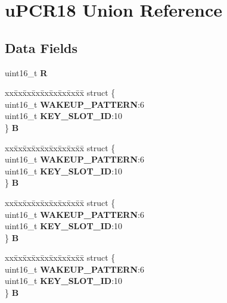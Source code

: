 \hypertarget{unionuPCR18}{}\section{u\+P\+C\+R18 Union Reference}
\label{unionuPCR18}
\subsection*{Data Fields}
\begin{DoxyCompactItemize}
\item 
\mbox{\label{unionuPCR18_ace980012aa9aabbf48fb47eae04e2c3a}} 
uint16\+\_\+t {\bfseries R}
\item 
\mbox{\label{unionuPCR18_a15c7bcda012c906c2258f91a2e07af6e}} 
\begin{tabbing}
xx\=xx\=xx\=xx\=xx\=xx\=xx\=xx\=xx\=\kill
struct \{\\
\>uint16\_t {\bfseries WAKEUP\_PATTERN}:6\\
\>uint16\_t {\bfseries KEY\_SLOT\_ID}:10\\
\} {\bfseries B}\\

\end{tabbing}\item 
\mbox{\label{unionuPCR18_a870ee155190066fb6cc0d3390ab81342}} 
\begin{tabbing}
xx\=xx\=xx\=xx\=xx\=xx\=xx\=xx\=xx\=\kill
struct \{\\
\>uint16\_t {\bfseries WAKEUP\_PATTERN}:6\\
\>uint16\_t {\bfseries KEY\_SLOT\_ID}:10\\
\} {\bfseries B}\\

\end{tabbing}\item 
\mbox{\label{unionuPCR18_a9f37591f2ac3d1f40bf3fc0c03a80dd6}} 
\begin{tabbing}
xx\=xx\=xx\=xx\=xx\=xx\=xx\=xx\=xx\=\kill
struct \{\\
\>uint16\_t {\bfseries WAKEUP\_PATTERN}:6\\
\>uint16\_t {\bfseries KEY\_SLOT\_ID}:10\\
\} {\bfseries B}\\

\end{tabbing}\item 
\mbox{\label{unionuPCR18_a976981f104fb9e3e941763efaa2e0c95}} 
\begin{tabbing}
xx\=xx\=xx\=xx\=xx\=xx\=xx\=xx\=xx\=\kill
struct \{\\
\>uint16\_t {\bfseries WAKEUP\_PATTERN}:6\\
\>uint16\_t {\bfseries KEY\_SLOT\_ID}:10\\
\} {\bfseries B}\\

\end{tabbing}\end{DoxyCompactItemize}


